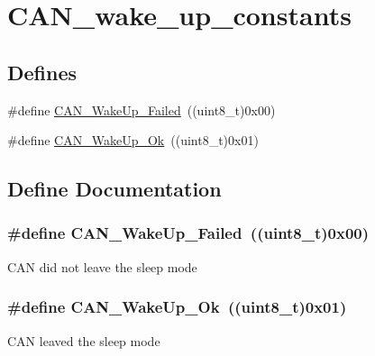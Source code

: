 \hypertarget{group__CAN__wake__up__constants}{
\section{CAN\_\-wake\_\-up\_\-constants}
\label{group__CAN__wake__up__constants}
}
\subsection*{Defines}
\begin{DoxyCompactItemize}
\item 
\#define \hyperlink{group__CAN__wake__up__constants_ga837fd7ad47fee78e43a186544e2b390b}{CAN\_\-WakeUp\_\-Failed}~((uint8\_\-t)0x00)
\item 
\#define \hyperlink{group__CAN__wake__up__constants_ga152e4935cf85bdfb803eb36b656cd690}{CAN\_\-WakeUp\_\-Ok}~((uint8\_\-t)0x01)
\end{DoxyCompactItemize}


\subsection{Define Documentation}
\hypertarget{group__CAN__wake__up__constants_ga837fd7ad47fee78e43a186544e2b390b}{
\subsubsection[{CAN\_\-WakeUp\_\-Failed}]{\setlength{\rightskip}{0pt plus 5cm}\#define CAN\_\-WakeUp\_\-Failed~((uint8\_\-t)0x00)}}
\label{group__CAN__wake__up__constants_ga837fd7ad47fee78e43a186544e2b390b}
CAN did not leave the sleep mode \hypertarget{group__CAN__wake__up__constants_ga152e4935cf85bdfb803eb36b656cd690}{
\subsubsection[{CAN\_\-WakeUp\_\-Ok}]{\setlength{\rightskip}{0pt plus 5cm}\#define CAN\_\-WakeUp\_\-Ok~((uint8\_\-t)0x01)}}
\label{group__CAN__wake__up__constants_ga152e4935cf85bdfb803eb36b656cd690}
CAN leaved the sleep mode 